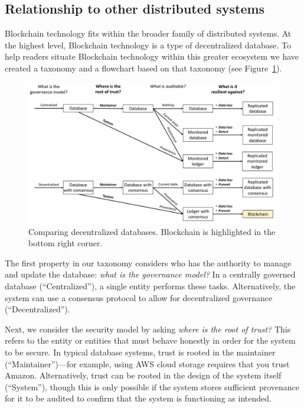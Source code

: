 \appendix

\subsection{Relationship to other distributed systems}
\label{sec:distributed-comparison}
Blockchain technology fits within the broader family of distributed systems.
At the highest level, Blockchain technology is a type of decentralized database.
To help readers situate Blockchain technology within this greater ecosystem we have created a taxonomy and a flowchart based on that taxonomy (see Figure~\ref{fig:blockchainFlowchart}).

\begin{figure}
	\centering
	\includegraphics[width=.75\textwidth]{figures/BlockchainFlowchart}
	\caption{Comparing decentralized databases. Blockchain is highlighted in the bottom right corner.}
	\label{fig:blockchainFlowchart}
\end{figure}

The first property in our taxonomy considers who has the authority to manage and update the database: \emph{what is the governance model?} In a centrally governed database (``Centralized''), a single entity performs these tasks. Alternatively, the system can use a consensus protocol to allow for decentralized governance (``Decentralized'').

Next, we consider the security model by asking \emph{where is the root of trust?}
This refers to the entity or entities that must behave honestly in order for the system to be secure.
In typical database systems, trust is rooted in the maintainer (``Maintainer'')---for example, using AWS cloud storage requires that you trust Amazon.
Alternatively, trust can be rooted in the design of the system itself (``System''), though this is only possible if the system stores sufficient provenance for it to be audited to confirm that the system is functioning as intended.

